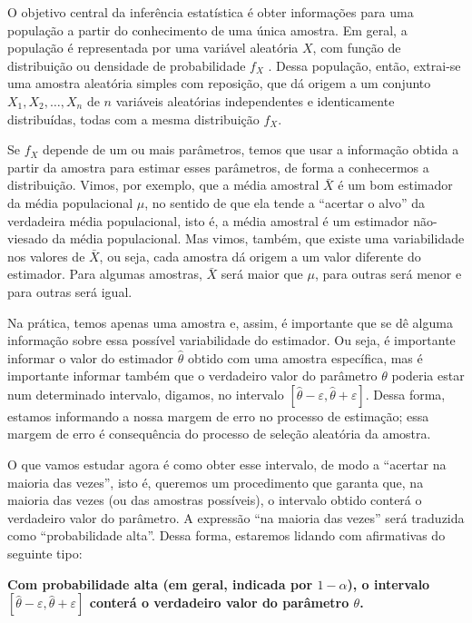 \documentclass[
]{book}
\begin{document}
O objetivo central da inferência estatística é obter informações para uma população a partir do conhecimento de uma única amostra. Em geral, a população é representada por uma variável aleatória \(X\), com função de distribuição ou densidade de probabilidade \(f_X\) . Dessa população, então, extrai-se uma amostra aleatória simples com reposição, que dá origem a um conjunto \(X_1, X_2, \ldots, X_n\) de \(n\) variáveis aleatórias independentes e identicamente distribuídas, todas com a mesma distribuição \(f_X\).

Se \(f_X\) depende de um ou mais parâmetros, temos que usar a informação obtida a partir da amostra para estimar esses parâmetros, de forma a conhecermos a distribuição. Vimos, por exemplo, que a média amostral \(\bar X\) é um bom estimador da média populacional \(\mu\), no sentido de que ela tende a ``acertar o alvo'' da verdadeira média populacional, isto é, a média amostral é um estimador não-viesado da média populacional. Mas vimos, também, que existe uma variabilidade nos valores de \(\bar X\), ou seja, cada amostra dá origem a um valor diferente do estimador. Para algumas amostras, \(\bar X\) será maior que \(\mu\), para outras será menor e para outras será igual.

Na prática, temos apenas uma amostra e, assim, é importante que se dê alguma informação sobre essa possível variabilidade do estimador. Ou seja, é importante informar o valor do estimador \(\hat \theta\) obtido com uma amostra específica, mas é importante informar também que o verdadeiro valor do parâmetro \(\theta\) poderia estar num determinado intervalo, digamos, no intervalo \(\left[\hat\theta-\varepsilon,\hat\theta+\varepsilon\right]\). Dessa forma, estamos informando a nossa margem de erro no processo de estimação; essa margem de erro é consequência do processo de seleção aleatória da amostra.

O que vamos estudar agora é como obter esse intervalo, de modo a ``acertar na maioria das vezes'', isto é, queremos um procedimento que garanta que, na maioria das vezes (ou das amostras possíveis), o intervalo obtido conterá o verdadeiro valor do parâmetro. A expressão ``na maioria das vezes'' será traduzida como ``probabilidade alta''. Dessa forma, estaremos lidando com afirmativas do seguinte tipo:

\textbf{Com probabilidade alta (em geral, indicada por $1-\alpha$), o intervalo $\left[\hat\theta-\varepsilon,\hat\theta+\varepsilon\right]$ conterá o verdadeiro valor do parâmetro $\theta$.}
\end{document}
